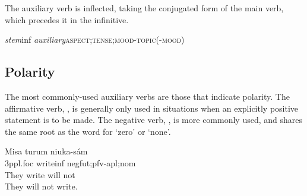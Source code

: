 \documentclass[grammar]{subfiles}
\begin{document}
  The auxiliary verb is inflected, taking the conjugated form of the main verb, which precedes it in the infinitive.

  \begin{exe}
    \ex\label{exe:vm_auxiliary_conjugation} \textit{stem}\bs\acs{inf} \textit{auxiliary}\bs\textsc{aspect;tense;mood-topic(-mood)}
  \end{exe}

  \subsection{Polarity}
  \label{ssec:vm_polarity}

  The most commonly-used auxiliary verbs are those that indicate polarity.  The affirmative verb, , is generally only used in situations when an explicitly positive statement is to be made.  The negative verb, , is more commonly used, and shares the same root as the word for ‘zero’ or ‘none’.

  \begin{exe}
    \ex {}
    \glll Misa turum niuka-sám\\
    \acs{3p}\acs{pl}.\acs{foc} write\bs\acs{inf} \acs{neg}\bs\acs{fut};\acs{pfv}-\acs{apl};\acs{nom}\\
    {They} {write} {will not}\\
    \glt They will not write.
  \end{exe}


\end{document}
